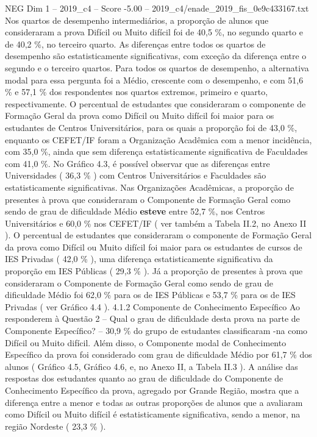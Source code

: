 \begin{textsample}{NEG Dim 1 – 2019\_c4 – Score -5.00 – 2019\_c4/enade\_2019\_fis\_0e9c433167.txt}
Nos quartos de desempenho intermediários, a proporção de alunos que consideraram a prova Difícil ou Muito difícil foi de 40,5 \%, no segundo quarto e de 40,2 \%, no terceiro quarto.
As diferenças entre todos os quartos de desempenho são estatisticamente significativas, com exceção da diferença entre o segundo e o terceiro quartos.
Para todos os quartos de desempenho, a alternativa modal para essa pergunta foi a Médio, crescente com o desempenho, e com 51,6 \% e 57,1 \% dos respondentes nos quartos extremos, primeiro e quarto, respectivamente.
O percentual de estudantes que consideraram o componente de Formação Geral da prova como Difícil ou Muito difícil foi maior para os estudantes de Centros Universitários, para os quais a proporção foi de 43,0 \%, enquanto os CEFET/IF foram a Organização Acadêmica com a menor incidência, com 35,0 \%, ainda que sem diferença estatisticamente significativa de Faculdades com 41,0 \%.
No Gráfico 4.3, é possível observar que as diferenças entre Universidades ( 36,3 \% ) com Centros Universitários e Faculdades são estatisticamente significativas.
Nas Organizações Acadêmicas, a proporção de presentes à prova que consideraram o Componente de Formação Geral como sendo de grau de dificuldade Médio \textbf{esteve} entre 52,7 \%, nos Centros Universitários e 60,0 \% nos CEFET/IF ( ver também a Tabela II.2, no Anexo II ).
O percentual de estudantes que consideraram o componente de Formação Geral da prova como Difícil ou Muito difícil foi maior para os estudantes de cursos de IES Privadas ( 42,0 \% ), uma diferença estatisticamente significativa da proporção em IES Públicas ( 29,3 \% ).
Já a proporção de presentes à prova que consideraram o Componente de Formação Geral como sendo de grau de dificuldade Médio foi 62,0 \% para os de IES Públicas e 53,7 \% para os de IES Privadas ( ver Gráfico 4.4 ). 4.1.2 Componente de Conhecimento Específico Ao responderem à Questão 2 – Qual o grau de dificuldade desta prova na parte de Componente Específico? – 30,9 \% do grupo de estudantes classificaram -na como Difícil ou Muito difícil.
Além disso, o Componente modal de Conhecimento Específico da prova foi considerado com grau de dificuldade Médio por 61,7 \% dos alunos ( Gráfico 4.5, Gráfico 4.6, e, no Anexo II, a Tabela II.3 ).
A análise das respostas dos estudantes quanto ao grau de dificuldade do Componente de Conhecimento Específico da prova, agregado por Grande Região, mostra que a diferença entre a menor e todas as outras proporções de alunos que a avaliaram como Difícil ou Muito difícil é estatisticamente significativa, sendo a menor, na região Nordeste ( 23,3 \% ).

\end{textsample}

